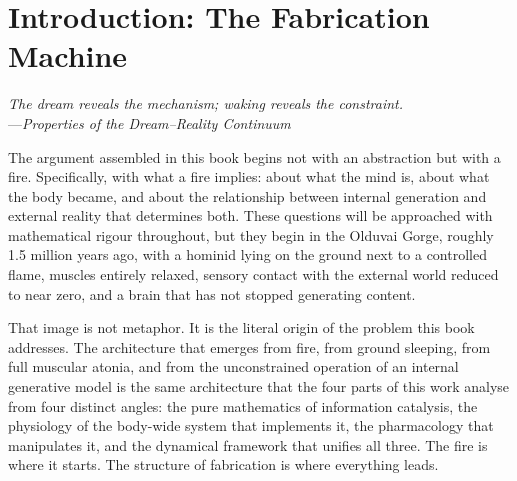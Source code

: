 
\chapter*{Introduction: The Fabrication Machine}

\setcounter{section}{0}
\renewcommand{\theequation}{0.\arabic{equation}}
\setcounter{equation}{0}

\vspace{1em}

\begin{flushright}
\textit{The dream reveals the mechanism; waking reveals the constraint.}\\[0.4em]
\small ---\textit{Properties of the Dream--Reality Continuum}~\cite{author_dream}
\end{flushright}

\vspace{2em}

\noindent The argument assembled in this book begins not with an abstraction but with a fire. Specifically, with what a fire implies: about what the mind is, about what the body became, and about the relationship between internal generation and external reality that determines both. These questions will be approached with mathematical rigour throughout, but they begin in the Olduvai Gorge, roughly 1.5 million years ago, with a hominid lying on the ground next to a controlled flame, muscles entirely relaxed, sensory contact with the external world reduced to near zero, and a brain that has not stopped generating content.

\noindent That image is not metaphor. It is the literal origin of the problem this book addresses. The architecture that emerges from fire, from ground sleeping, from full muscular atonia, and from the unconstrained operation of an internal generative model is the same architecture that the four parts of this work analyse from four distinct angles: the pure mathematics of information catalysis, the physiology of the body-wide system that implements it, the pharmacology that manipulates it, and the dynamical framework that unifies all three. The fire is where it starts. The structure of fabrication is where everything leads.

